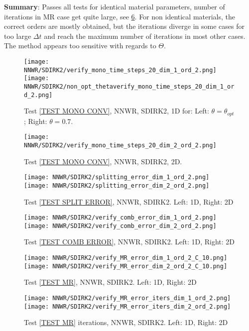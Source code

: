 \documentclass[a4paper,10pt]{article}
\begin{document}
\textbf{Summary}: Passes all tests for identical material parameters, number of iterations in MR case get quite large, see \ref{FIG NNWR SDIRK2 MR ITERS}. For non identical materials, the correct orders are mostly obtained, but the iterations diverge in some cases for too large $\Delta t$ and reach the maximum number of iterations in most other cases. The method appears too sensitive with regards to $\Theta$.

\begin{figure}[!ht]
\texttt{[image: NNWR/SDIRK2/verify\_mono\_time\_steps\_20\_dim\_1\_ord\_2.png]}
\texttt{[image: NNWR/SDIRK2/non\_opt\_thetaverify\_mono\_time\_steps\_20\_dim\_1\_ord\_2.png]}
\caption{Test \ref{TEST MONO CONV}, NNWR, SDIRK2, 1D for: Left: $\theta = \theta_{opt}$; Right: $\theta = 0.7$.}
\label{FIG NNWR SDIRK2 1D MONO CONV}
\end{figure}

\begin{figure}[!ht]
\texttt{[image: NNWR/SDIRK2/verify\_mono\_time\_steps\_20\_dim\_2\_ord\_2.png]}
\caption{Test \ref{TEST MONO CONV}, NNWR, SDIRK2, 2D.}
\label{FIG NNWR SDIRK2 2D MONO CONV}
\end{figure}

\begin{figure}[!ht]
\texttt{[image: NNWR/SDIRK2/splitting\_error\_dim\_1\_ord\_2.png]}
\texttt{[image: NNWR/SDIRK2/splitting\_error\_dim\_2\_ord\_2.png]}
\caption{Test \ref{TEST SPLIT ERROR}, NNWR, SDIRK2. Left: 1D, Right: 2D}
\label{FIG NNWR SDIRK2 SPLIT ERROR}
\end{figure}

\begin{figure}[!ht]
\texttt{[image: NNWR/SDIRK2/verify\_comb\_error\_dim\_1\_ord\_2.png]}
\texttt{[image: NNWR/SDIRK2/verify\_comb\_error\_dim\_2\_ord\_2.png]}
\caption{Test \ref{TEST COMB ERROR}, NNWR, SDIRK2. Left: 1D, Right: 2D}
\label{FIG NNWR SDIRK2 COMB ERROR}
\end{figure}

\begin{figure}[!ht]
\texttt{[image: NNWR/SDIRK2/verify\_MR\_error\_dim\_1\_ord\_2\_C\_10.png]}
\texttt{[image: NNWR/SDIRK2/verify\_MR\_error\_dim\_2\_ord\_2\_C\_10.png]}
\caption{Test \ref{TEST MR}, NNWR, SDIRK2. Left: 1D, Right: 2D}
\label{FIG NNWR SDIRK2 MR ERROR}
\end{figure}

\begin{figure}[!ht]
\texttt{[image: NNWR/SDIRK2/verify\_MR\_error\_iters\_dim\_1\_ord\_2.png]}
\texttt{[image: NNWR/SDIRK2/verify\_MR\_error\_iters\_dim\_2\_ord\_2.png]}
\caption{Test \ref{TEST MR} iterations, NNWR, SDIRK2. Left: 1D, Right: 2D}
\label{FIG NNWR SDIRK2 MR ITERS}
\end{figure}
\end{document}
